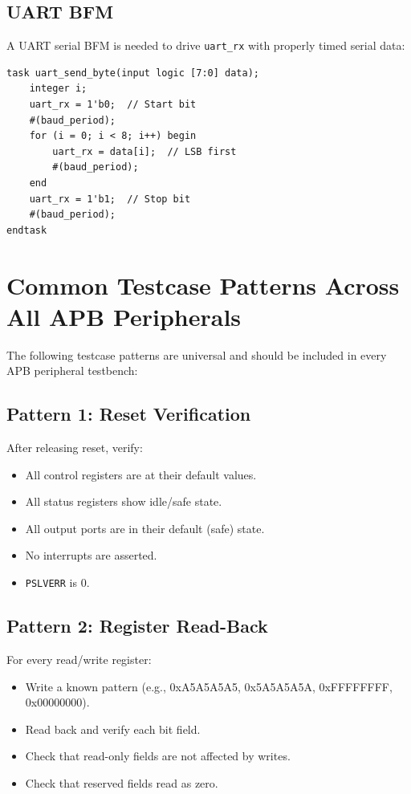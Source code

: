 \subsection{UART BFM}

A UART serial BFM is needed to drive \texttt{uart\_rx} with properly timed serial data:
\begin{lstlisting}
task uart_send_byte(input logic [7:0] data);
    integer i;
    uart_rx = 1'b0;  // Start bit
    #(baud_period);
    for (i = 0; i < 8; i++) begin
        uart_rx = data[i];  // LSB first
        #(baud_period);
    end
    uart_rx = 1'b1;  // Stop bit
    #(baud_period);
endtask
\end{lstlisting}

\section{Common Testcase Patterns Across All APB Peripherals}

The following testcase patterns are universal and should be included in every APB peripheral
testbench:

\subsection{Pattern 1: Reset Verification}

After releasing reset, verify:
\begin{itemize}[leftmargin=2em]
  \item All control registers are at their default values.
  \item All status registers show idle/safe state.
  \item All output ports are in their default (safe) state.
  \item No interrupts are asserted.
  \item \texttt{PSLVERR} is 0.
\end{itemize}

\subsection{Pattern 2: Register Read-Back}

For every read/write register:
\begin{itemize}[leftmargin=2em]
  \item Write a known pattern (e.g., 0xA5A5A5A5, 0x5A5A5A5A, 0xFFFFFFFF, 0x00000000).
  \item Read back and verify each bit field.
  \item Check that read-only fields are not affected by writes.
  \item Check that reserved fields read as zero.
\end{itemize}

